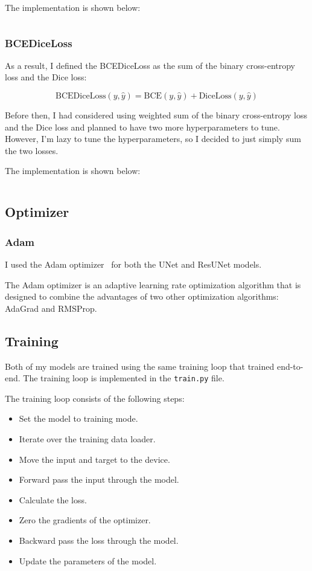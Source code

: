 The implementation is shown below:

\inputminted[firstline=31, lastline=41, highlightlines={39-41}]{python}{../src/utils.py}

\subsubsection{BCEDiceLoss}

As a result, I defined the BCEDiceLoss as the sum of the binary cross-entropy loss and the Dice loss:

\begin{equation}
    \text{BCEDiceLoss}(y, \hat{y}) = \text{BCE}(y, \hat{y}) + \text{DiceLoss}(y, \hat{y})
\end{equation}

Before then, I had considered using weighted sum of the binary cross-entropy loss and the Dice loss and planned to have two more hyperparameters to tune.
However, I'm lazy to tune the hyperparameters, so I decided to just simply sum the two losses.

The implementation is shown below:

\inputminted[firstline=44, highlightlines={50}]{python}{../src/utils.py}

\subsection{Optimizer}

\subsubsection{Adam}

I used the Adam optimizer~\cite{Adam} for both the UNet and ResUNet models.

The Adam optimizer is an adaptive learning rate optimization algorithm that is designed to combine the advantages of two other optimization algorithms: AdaGrad and RMSProp.

\subsection{Training}

Both of my models are trained using the same training loop that trained end-to-end.
The training loop is implemented in the \texttt{train.py} file.

The training loop consists of the following steps:
\begin{itemize}
    \item Set the model to training mode.
    \item Iterate over the training data loader.
    \item Move the input and target to the device.
    \item Forward pass the input through the model.
    \item Calculate the loss.
    \item Zero the gradients of the optimizer.
    \item Backward pass the loss through the model.
    \item Update the parameters of the model.
\end{itemize}


